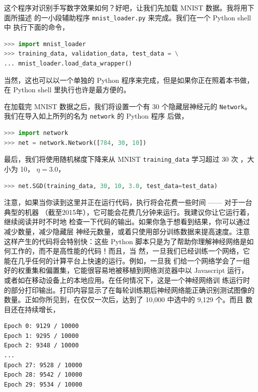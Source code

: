 

这个程序对识别手写数字效果如何？好吧，让我们先加载 MNIST 数据。我将用下面所描述
的一小段辅助程序 \lstinline!mnist_loader.py! 来完成。我们在一个 Python shell 中
执行下面的命令，

\begin{lstlisting}[language=Python]
>>> import mnist_loader
>>> training_data, validation_data, test_data = \
... mnist_loader.load_data_wrapper()
\end{lstlisting}

当然，这也可以以一个单独的 Python 程序来完成，但是如果你正在照着本书做，在
Python shell 里执行也许是最方便的。

在加载完 MNIST 数据之后，我们将设置一个有 30 个隐藏层神经元的
\lstinline!Network!。我们在导入如上所列的名为 \lstinline!network! 的 Python 程序
后做，

\begin{lstlisting}[language=Python]
>>> import network
>>> net = network.Network([784, 30, 10])
\end{lstlisting}

最后，我们将使用随机梯度下降来从 MNIST \lstinline!training_data! 学习超过 30 次%
\epochs{}，\minibatch{}大小为 10，\learningrate{} $\eta = 3.0$，

\begin{lstlisting}[language=Python]
>>> net.SGD(training_data, 30, 10, 3.0, test_data=test_data)
\end{lstlisting}

注意，如果当你读到这里并正在运行代码，执行将会花费一些时间 —— 对于一台典型的机器
（截至2015年），它可能会花费几分钟来运行。我建议你让它运行着，继续阅读并时不时地
检查一下代码的输出。如果你急于想看到结果，你可以通过减少\epochs{}数量，减少隐藏层
神经元数量，或着只使用部分训练数据来提高速度。注意这样产生的代码将会特别快：这些
Python 脚本只是为了帮助你理解神经网络是如何工作的，而不是高性能的代码！而且，当
然，一旦我们已经训练一个网络，它能在几乎任何的计算平台上快速的运行。例如，一旦我
们给一个网络学会了一组好的权重集和偏置集，它能很容易地被移植到网络浏览器中以
Javascript 运行，或者如在移动设备上的本地应用。在任何情况下，这是一个神经网络训
练运行时的部分打印输出。打印内容显示了在每轮训练期后神经网络能正确识别测试图像的
数量。正如你所见到，在仅仅一次\epoch{}后，达到了 10,000 中选中的 9,129 个。而且
数目还在持续增长，

\begin{lstlisting}[language=sh]
Epoch 0: 9129 / 10000
Epoch 1: 9295 / 10000
Epoch 2: 9348 / 10000
...
Epoch 27: 9528 / 10000
Epoch 28: 9542 / 10000
Epoch 29: 9534 / 10000
\end{lstlisting}

